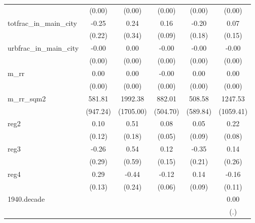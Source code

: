 {\begin{tabular}{l*{5}{c}}
          &   (0.00)         &   (0.00)         &   (0.00)         &   (0.00)         &   (0.00)         \\
\addlinespace
totfrac\_in\_main\_city&    -0.25         &     0.24         &     0.16         &    -0.20         &     0.07         \\
          &   (0.22)         &   (0.34)         &   (0.09)         &   (0.18)         &   (0.15)         \\
\addlinespace
urbfrac\_in\_main\_city&    -0.00\sym{***}&     0.00         &    -0.00         &    -0.00\sym{***}&    -0.00         \\
          &   (0.00)         &   (0.00)         &   (0.00)         &   (0.00)         &   (0.00)         \\
\addlinespace
m\_rr      &     0.00\sym{*}  &     0.00         &    -0.00         &     0.00         &     0.00         \\
          &   (0.00)         &   (0.00)         &   (0.00)         &   (0.00)         &   (0.00)         \\
\addlinespace
m\_rr\_sqm2 &   581.81         &  1992.38         &   882.01         &   508.58         &  1247.53         \\
          & (947.24)         &(1705.00)         & (504.70)         & (589.84)         &(1059.41)         \\
\addlinespace
reg2      &     0.10         &     0.51\sym{**} &     0.08         &     0.05         &     0.22\sym{**} \\
          &   (0.12)         &   (0.18)         &   (0.05)         &   (0.09)         &   (0.08)         \\
\addlinespace
reg3      &    -0.26         &     0.54         &     0.12         &    -0.35         &     0.14         \\
          &   (0.29)         &   (0.59)         &   (0.15)         &   (0.21)         &   (0.26)         \\
\addlinespace
reg4      &     0.29\sym{*}  &    -0.44         &    -0.12\sym{*}  &     0.14         &    -0.16         \\
          &   (0.13)         &   (0.24)         &   (0.06)         &   (0.09)         &   (0.11)         \\
\addlinespace
1940.decade&                  &                  &                  &                  &     0.00         \\
          &                  &                  &                  &                  &      (.)         \\

\end{tabular}}
